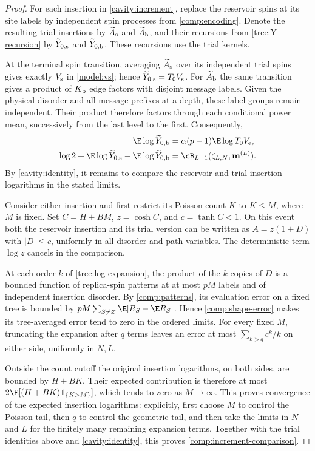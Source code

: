 \begin{proof}
For each insertion in \cref{cavity:increment}, replace the reservoir spins
at its site labels by independent spin processes from \cref{comp:encoding}.
Denote the resulting trial insertions by $\widetilde A_{\rm s}$ and
$\widetilde A_{\rm b}$, and their recursions from
\eqref{tree:Y-recursion} by $\widetilde Y_{0,\rm s}$ and
$\widetilde Y_{0,\rm b}$. These recursions use the trial kernels.

At the terminal spin transition, averaging $\widetilde A_{\rm s}$ over
its independent trial spins gives exactly $V_{\rm s}$ in
\eqref{model:vs}; hence $\widetilde Y_{0,\rm s}=T_0V_{\rm s}$.
For $\widetilde A_{\rm b}$ the same transition gives a product of
$K_{\rm b}$ edge factors with disjoint message labels. Given the physical
disorder and all message prefixes at a depth, these label groups remain
independent. Their product therefore factors through each conditional
power mean, successively from the last level to the first. Consequently,
\[
 \begin{aligned}
 \E\log\widetilde Y_{0,\rm b}
 &=\alpha(p-1)\E\log T_0V_{\rm e},\\
 \log2+\E\log\widetilde Y_{0,\rm s}
       -\E\log\widetilde Y_{0,\rm b}
 &=\cB_{L-1}(\zeta_{L,N},\mathbf m^{(L)}).
 \end{aligned}
\]
By \eqref{cavity:identity}, it remains to compare the reservoir and trial
insertion logarithms in the stated limits.

Consider either insertion and first restrict its
Poisson count $K$ to $K\le M$, where $M$ is fixed. Set
$C=H+BM$, $z=\cosh C$, and $c=\tanh C<1$. On this event both the reservoir
insertion and its trial version can be written as
$A=z(1+D)$ with $|D|\le c$, uniformly in all disorder and path variables.
The deterministic term $\log z$ cancels in the comparison.

At each order $k$ of \cref{tree:log-expansion}, the product of the $k$
copies of $D$ is a bounded function of replica-spin patterns at at most
$pM$ labels and of independent insertion disorder. By
\cref{comp:patterns}, its evaluation error on a fixed tree is bounded by
$pM\sum_{S\ne\varnothing}\E|R_S-\E R_S|$. Hence
\eqref{comp:shape-error} makes its tree-averaged error tend to zero in the
ordered limits. For every fixed $M$, truncating the expansion after $q$
terms leaves an error at most
$\sum_{k>q}c^k/k$ on either side, uniformly in $N,L$.

Outside the count cutoff the original insertion logarithms, on both sides,
are bounded by $H+BK$. Their expected contribution is therefore at most
$2\E[(H+BK)\mathbf1_{\{K>M\}}]$, which tends to zero as $M\to\infty$.
This proves convergence of the expected insertion logarithms: explicitly,
first choose $M$ to control the Poisson tail, then $q$ to control the
geometric tail, and then take the limits in $N$ and $L$ for the finitely
many remaining expansion terms. Together with the trial identities above
and \eqref{cavity:identity}, this proves \eqref{comp:increment-comparison}.
\end{proof}

